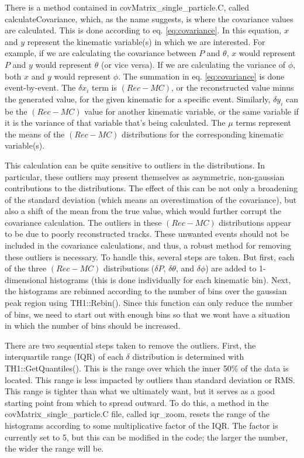 \documentclass[showpacs,amsmath,amssymb,aps,prc,floatfix,showkeys,nofootinbib]{revtex4-1}
\begin{document}
There is a method contained in covMatrix\_single\_particle.C, called calculateCovariance, which, as the name suggests, is where the covariance values are calculated. This is done according to eq. \ref{eq:covariance}. In this equation, $x$ and $y$ represent the kinematic variable(s) in which we are interested. For example, if we are calculating the covariance between $P$ and $\theta$, $x$ would represent $P$ and $y$ would represent $\theta$ (or vice versa). If we are calculating the variance of $\phi$, both $x$ and $y$ would represent $\phi$. The summation in eq. \ref{eq:covariance} is done event-by-event. The $\delta x_i$ term is $(Rec-MC)$, or the reconstructed value minus the generated value, for the given kinematic for a specific event. Similarly, $\delta y_i$ can be the $(Rec-MC)$ value for another kinematic variable, or the same variable if it is the variance of that variable that's being calculated. The $\mu$ terms represent the means of the $(Rec-MC)$ distributions  for the corresponding kinematic variable(s).

This calculation can be quite sensitive to outliers in the distributions. In particular, these outliers may present themselves as asymmetric, non-gaussian contributions to the distributions. The effect of this can be not only a broadening of the standard deviation (which means an overestimation of the covariance), but also a shift of the mean from the true value, which would further corrupt the covariance calculation. The outliers in these $(Rec-MC)$ distributions appear to be due to poorly reconstructed tracks. These unwanted events should not be included in the covariance calculations, and thus, a robust method for removing these outliers is necessary. To handle this, several steps are taken. But first, each of the three $(Rec-MC)$ distributions ($\delta P$, $\delta \theta$, and $\delta \phi$) are added to 1-dimensional histograms (this is done individually for each kinematic bin). Next, the histograms are rebinned according to the number of bins over the gaussian peak region using TH1::Rebin(). Since this function can only reduce the number of bins, we need to start out with enough bins so that we wont have a situation in which the number of bins should be increased. 

There are two sequential steps taken to remove the outliers. First, the interquartile range (IQR) of each $\delta$ distribution is determined with TH1::GetQuantiles(). This is the range over which the inner 50\% of the data is located. This range is less impacted by outliers than standard deviation or RMS. This range is tighter than what we ultimately want, but it serves as a good starting point from which to spread outward. To do this, a method in the covMatrix\_single\_particle.C file, called iqr\_zoom, resets the range of the histograms according to some multiplicative factor of the IQR. The factor is currently set to 5, but this can be modified in the code; the larger the number, the wider the range will be.
\end{document}
